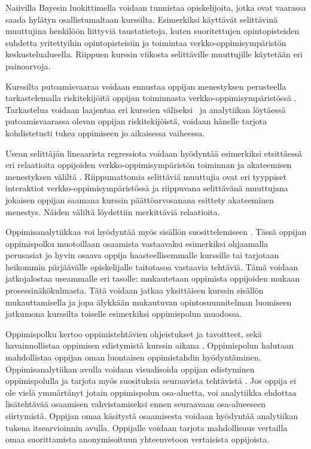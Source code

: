 Naiivilla Bayesin luokittimella voidaan tunnistaa opiskelijoita, jotka ovat vaarassa saada hylätyn osallistumaltaan kurssilta. Esimerkiksi \citet{barberCourseCorrectionUsing2012} käyttävät selittävinä muuttujina henkilöön liittyviä taustatietoja, kuten suoritettujen opintopisteiden suhdetta yritettyihin opintopisteisiin ja toimintaa verkko-oppimisympäristön keskustelualueella. Riippuen kurssin viikosta selittäville muuttujille käytetään eri painoarvoja.

Kurssilta putoamisvaaraa voidaan ennustaa oppijan menestyksen perusteella tarkastelemalla riskitekijöitä oppijan toiminnasta verkko-oppimisympäristössä \citep{oliveSupervisedLearningFramework2018, suhonenUsingMoodleData2019}. Tarkastelua voidaan laajentaa eri kurssien väliseksi~\citep{kinnari-korpelaOppimisanalytiikallaTehokkaampaanOhjaukseen2020} ja analytiikan löytäessä putoamisvaarassa olevan oppijan riskitekijöistä, voidaan hänelle tarjota kohdistetusti tukea oppimiseen jo aikaisessa vaiheessa.

Usean selittäjän lineaarista regressiota voidaan hyödyntää esimerkiksi etsittäessä eri relaatioita oppijoiden verkko-oppimisympäristön toiminnan ja akateemisen menestyksen väliltä \citep{agudo-peregrinaCanWePredict2014}. Riippumattomia selittäviä muuttujia ovat eri tyyppiset interaktiot verkko-oppimisympäristössä ja riippuvana selittävänä muuttujana jokaisen oppijan saamana kurssin päättöarvosanana esittety akateeminen menestys. Näiden väliltä löydettiin merkittäviä relaatioita.

Oppimisanalytiikkaa voi hyödyntää myös sisällön suosittelemiseen \citep{longPenetratingFogAnalytics2011,siemensLearningAnalyticsEmergence2013}. Tässä oppijan oppimispolku muotoillaan osaamista vastaavaksi esimerkiksi ohjaamalla perusasiat jo hyvin osaava oppija haasteellisemmalle kurssille tai tarjotaan heikommin pärjäävälle opiskelijalle taitotasoa vastaavia tehtäviä. Tämä voidaan jatkojalostaa useammalle eri tasolle: mukautetaan oppimista oppijoiden mukaan prosessinäkökulmasta. Tätä voidaan jatkaa yksittäisen kurssin sisällön mukauttamisella ja jopa älykkään mukautuvan opintosuunnitelman luomiseen jatkumona kurssilta toiselle esimerkiksi oppimispolun muodossa.

Oppimispolku kertoo oppimistehtävien ohjeistukset ja tavoitteet, sekä havainnollistaa oppimisen edistymistä kurssin aikana \citep{toivolaFlippedLearningKaanteinen2017}. Oppimispolun halutaan mahdollistaa oppijan oman luontaisen oppimistahdin hyödyntäminen. Oppimisanalytiikan avulla voidaan visualisoida oppijan edistyminen oppimispolulla ja tarjota myös suosituksia seuraavista tehtävistä \citep{longPenetratingFogAnalytics2011}. Jos oppija ei ole vielä ymmärtänyt jotain oppimispolun osa-aluetta, voi analytiikka ehdottaa lisätehtävää osaamisen vahvistamiseksi ennen seuraavaan osa-alueeseen siirtymistä. Oppijan omaa käsitystä osaamisesta voidaan hyödyntää analytiikan tukena itsearvioinnin avulla. Oppijalle voidaan tarjota mahdollisuus vertailla omaa suorittamista anonymisoituun yhteenvetoon vertaisista oppijoista.


